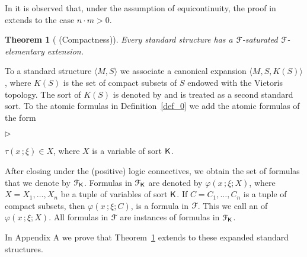 \documentclass{amsproc}
\newcommand{\mylabel}[1]{{#1}\hfill}
\renewenvironment{itemize}
  {\begin{list}{$\triangleright$}{%
  \setlength{\parskip}{0mm}
  \setlength{\topsep}{.1\baselineskip}
  \setlength{\rightmargin}{0mm}
  \setlength{\listparindent}{0mm}
  \setlength{\itemindent}{0mm}
  \setlength{\labelwidth}{3ex}
  \setlength{\itemsep}{.1\baselineskip}
  \setlength{\parsep}{.1\baselineskip}
  \setlength{\partopsep}{0mm}
  \setlength{\labelsep}{1ex}
  \setlength{\leftmargin}{\labelwidth+\labelsep}
  \let\makelabel\mylabel}}{%
\end{list}}
\newcounter{thm}
\theoremstyle{mio}
\newtheorem{theorem}[thm]{Theorem}\tcolorboxenvironment{theorem}{mythm}
\renewcommand*{\emph}[1]{%
   \smash{\tikz[baseline]\node[rectangle, fill=teal!25, rounded corners, inner xsep=0.5ex, inner ysep=0.2ex, anchor=base, minimum height = 2.7ex]{\strut #1};}}
\begin{document}
 In \cite{Z} it is observed that, under the assumption of equicontinuity, the proof in \cite{clcl} extends to the case $n{\cdot}m> 0$.

 \begin{theorem}[ (Compactness)]\label{thm_compactness}
  Every standard structure has a ${\EuScript F}$-saturated ${\EuScript F}$-elementary extension.
\end{theorem}

To a standard structure $\langle M,S\rangle$ we associate a canonical expansion $\big\langle M,S,K(S)\big\rangle$, where $K(S)$ is the set of compact subsets of $S$ endowed with the Vietoris topology.
The sort of $K(S)$ is denoted by \emph{${\sf K}$\/} and is treated as a second standard sort.
To the atomic formulas in Definition~\ref{def_0} we add the atomic formulas of the form

\begin{itemize}
  \item[iii.] $\tau(x\,;\xi)\in X$, where $X$ is a variable of sort ${\sf K}$.
\end{itemize}

After closing under the (positive) logic connectives, we obtain the set of formulas that we denote by ${\EuScript F}_{\sf K}$.
%
Formulas in ${\EuScript F}_{\sf K}$ are denoted by $\varphi(x\,;\xi;X)$, where $X=X_1,\dots,X_n$ be a tuple of variables of sort ${\sf K}$.
If $C=C _1,\dots,C_n$ is a tuple of compact subsets, then $\varphi(x\,;\xi;C)$, is a formula in ${\EuScript F}$.
This we call an \emph{instance\/} of $\varphi(x\,;\xi;X)$.
All formulas in ${\EuScript F}$ are instances of formulas in ${\EuScript F}_{\sf K}$.

\noindent\llap{\textcolor{red}{\Large\warning}\kern1.5ex}\ignorespaces
In Appendix A we prove that Theorem~\ref{thm_compactness} extends to these expanded standard structures.
\end{document}
